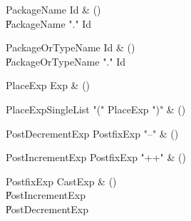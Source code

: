 \begin{bbgrammar}

PackageName \label{prod:PackageName}  \: Id & () \\

    \| PackageName \xcd"." Id \\

\end{bbgrammar}

\begin{bbgrammar}

PackageOrTypeName \label{prod:PackageOrTypeName}  \: Id & () \\

    \| PackageOrTypeName \xcd"." Id \\

\end{bbgrammar}

\begin{bbgrammar}

PlaceExp \label{prod:PlaceExp}  \: Exp & () \\


\end{bbgrammar}

\begin{bbgrammar}

PlaceExpSingleList \label{prod:PlaceExpSingleList}  \: \xcd"(" PlaceExp \xcd")" & () \\


\end{bbgrammar}

\begin{bbgrammar}

PostDecrementExp \label{prod:PostDecrementExp}  \: PostfixExp \xcd"--" & () \\


\end{bbgrammar}

\begin{bbgrammar}

PostIncrementExp \label{prod:PostIncrementExp}  \: PostfixExp \xcd"++" & () \\


\end{bbgrammar}

\begin{bbgrammar}

PostfixExp \label{prod:PostfixExp}  \: CastExp & () \\

    \| PostIncrementExp \\
    \| PostDecrementExp \\

\end{bbgrammar}

